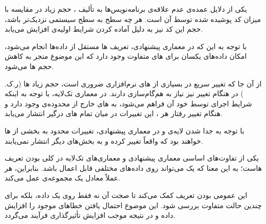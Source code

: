 
یکی از دلایل عمده‌ی عدم علاقه‌ی برنامه‌نویس‌ها به تألیف ، حجم زیاد  در مقایسه با میزان کد پوشیده شده توسط آن است. هر چه سطح  به سطح سیستمی نزدیک‌تر باشد، حجم این کد نیز به دلیل آماده کردن شرایط اولیه‌ی  افزایش می‌یابد.

با توجه به این که در معماری پیشنهادی، تعریف ‌ها مستقل از داده‌ها انجام می‌شود، امکان  داده‌های یکسان برای ‌های متفاوت وجود دارد که این موضوع منجر به کاهش حجم ‌ها می‌شود.

از آن جا که تغییر سریع در بسیاری از ‌های نرم‌افزاری ضروری است، حجم زیاد ‌ها (ر.ک. ) در هنگام تغییر نیز نیاز به هم‌گام‌سازی دارند. در معماری تک‌لایه، با توجه به اینکه شرایط اجرای  توسط خود آن فراهم می‌شود،  به ‌های خارج از محدوده‌ی  وجود دارد و هنگام تغییر رفتار هر ، این تغییرات در میان تمام ‌های درگیر انتشار می‌یابد.

با توجه به جدا شدن لایه‌ی  و  در معماری پیشنهادی، تغییرات محدود به بخشی از ‌ها خواهند بود که واقعاً تغییر کرده و به بخش‌های دیگر انتشار نمی‌یابند.


یکی از تفاوت‌های اساسی معماری پیشنهادی و معماری‌های تک‌لایه در کلی بودن تعریف ‌هاست؛ به این معنا که یک  می‌تواند روی داده‌های مختلفی قابل اعمال باشد. بنابراین، هر  عملاً معادل یک مجموعه‌ی  عمل می‌کند.

این عمومی بودن تعریف  کمک می‌کند تا صحت آن نه فقط روی یک داده، بلکه برای چندین حالت متفاوت بررسی شود. این موضوع احتمال یافتن خطاهای موجود را افزایش داده و در نتیجه موجب افزایش تأثیرگذاری فرآیند  می‌گردد.
